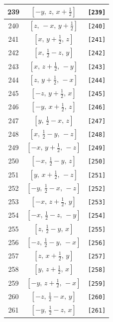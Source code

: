 \documentclass[fleqn,8pt]{jsarticle}
\begin{document}
\begin{longtable}{ccc}
239 & $\left[ - y,\, z,\, x + \frac{1}{2} \right]$ & {\tt [239]} \\ \hline
240 & $\left[ z,\, - x,\, y + \frac{1}{2} \right]$ & {\tt [240]} \\ \hline
241 & $\left[ x,\, y + \frac{1}{2},\, z \right]$ & {\tt [241]} \\ \hline
242 & $\left[ x,\, \frac{1}{2} - z,\, y \right]$ & {\tt [242]} \\ \hline
243 & $\left[ x,\, z + \frac{1}{2},\, - y \right]$ & {\tt [243]} \\ \hline
244 & $\left[ z,\, y + \frac{1}{2},\, - x \right]$ & {\tt [244]} \\ \hline
245 & $\left[ - z,\, y + \frac{1}{2},\, x \right]$ & {\tt [245]} \\ \hline
246 & $\left[ - y,\, x + \frac{1}{2},\, z \right]$ & {\tt [246]} \\ \hline
247 & $\left[ y,\, \frac{1}{2} - x,\, z \right]$ & {\tt [247]} \\ \hline
248 & $\left[ x,\, \frac{1}{2} - y,\, - z \right]$ & {\tt [248]} \\ \hline
249 & $\left[ - x,\, y + \frac{1}{2},\, - z \right]$ & {\tt [249]} \\ \hline
250 & $\left[ - x,\, \frac{1}{2} - y,\, z \right]$ & {\tt [250]} \\ \hline
251 & $\left[ y,\, x + \frac{1}{2},\, - z \right]$ & {\tt [251]} \\ \hline
252 & $\left[ - y,\, \frac{1}{2} - x,\, - z \right]$ & {\tt [252]} \\ \hline
253 & $\left[ - x,\, z + \frac{1}{2},\, y \right]$ & {\tt [253]} \\ \hline
254 & $\left[ - x,\, \frac{1}{2} - z,\, - y \right]$ & {\tt [254]} \\ \hline
255 & $\left[ z,\, \frac{1}{2} - y,\, x \right]$ & {\tt [255]} \\ \hline
256 & $\left[ - z,\, \frac{1}{2} - y,\, - x \right]$ & {\tt [256]} \\ \hline
257 & $\left[ z,\, x + \frac{1}{2},\, y \right]$ & {\tt [257]} \\ \hline
258 & $\left[ y,\, z + \frac{1}{2},\, x \right]$ & {\tt [258]} \\ \hline
259 & $\left[ - y,\, z + \frac{1}{2},\, - x \right]$ & {\tt [259]} \\ \hline
260 & $\left[ - z,\, \frac{1}{2} - x,\, y \right]$ & {\tt [260]} \\ \hline
261 & $\left[ - y,\, \frac{1}{2} - z,\, x \right]$ & {\tt [261]} \\ \hline

\end{longtable}
\end{document}

